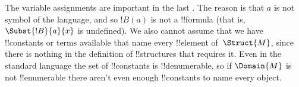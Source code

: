 \documentclass[../../../include/open-logic-section]{subfiles}
\begin{document}
\begin{explain}
The variable assignments are important in the last
.    The reason is that $a$ is not
symbol of the language, and so $!B(a)$ is not a !!{formula} (that is,
$\Subst{!B}{a}{x}$ is undefined).  We also cannot assume that we have
!!{constant}s or terms available that name every !!{element}
of~$\Struct{M}$, since there is nothing in the definition of
!!{structure}s that requires it.  Even in the standard language the
set of !!{constant}s is !!{denumerable}, so if $\Domain{M}$ is not
!!{enumerable} there aren't even enough !!{constant}s to name every
object.
\end{explain}
\end{document}
